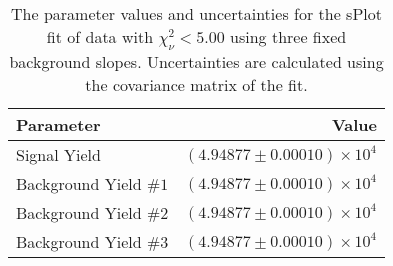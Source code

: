
\begin{table}[ht]
    \begin{center}
        \begin{tabular}{lr}\toprule
            Parameter & Value \\\midrule
            Signal Yield & $(4.94877 \pm 0.00010) \times 10^{4}$ \\
            Background Yield $\#1$ & $(4.94877 \pm 0.00010) \times 10^{4}$ \\
            Background Yield $\#2$ & $(4.94877 \pm 0.00010) \times 10^{4}$ \\
            Background Yield $\#3$ & $(4.94877 \pm 0.00010) \times 10^{4}$ \\\bottomrule
        \end{tabular}
        \caption{The parameter values and uncertainties for the sPlot fit of data with $\chi^2_\nu < 5.00$ using three fixed background slopes. Uncertainties are calculated using the covariance matrix of the fit.}\label{tab:splot-fit-results-chisqdof-5.00-fixed-3}
    \end{center}
\end{table}

